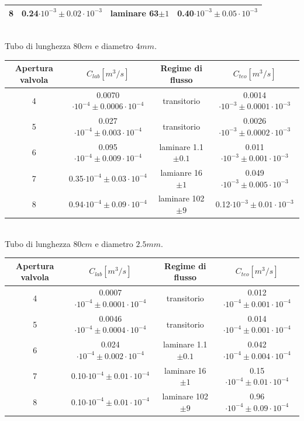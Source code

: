 \documentclass[a4paper,11pt]{article}
\begin{document}
\begin{center}
\begin{tabular}{|c|c|c|c|}
\hline 8 & 0.24$\cdot10^{-3}\pm 0.02\cdot10^{-3}$ & laminare 63$\pm1$ & 0.40$\cdot10^{-3}\pm 0.05\cdot10^{-3}$ \\ 
\hline 
\end{tabular}\\
\vspace{3pt}
Tubo di lunghezza $80cm$ e diametro $4mm$.
\\
\vspace{10pt}
\begin{tabular}{|c|c|c|c|}
\hline Apertura valvola & $C_{lab} [m^3/s]$ & Regime di flusso & $C_{teo} [m^3/s]$ \\ 
\hline 4 & 0.0070$\cdot10^{-4}\pm 0.0006\cdot10^{-4}$ & transitorio & 0.0014$\cdot10^{-3}\pm 0.0001\cdot10^{-3}$ \\ 
\hline 5 & 0.027$\cdot10^{-4}\pm 0.003\cdot10^{-4}$ & transitorio & 0.0026$\cdot10^{-3}\pm 0.0002\cdot10^{-3}$ \\ 
\hline 6 & 0.095$\cdot10^{-4}\pm 0.009\cdot10^{-4}$ & laminare 1.1$\pm0.1$ & 0.011$\cdot10^{-3}\pm 0.001\cdot10^{-3}$\\
\hline 7 & 0.35$\cdot10^{-4}\pm 0.03\cdot10^{-4}$ & lamianre 16$\pm1$ & 0.049$\cdot10^{-3}\pm 0.005\cdot10^{-3}$ \\
\hline 8 & 0.94$\cdot10^{-4}\pm 0.09\cdot10^{-4}$ & laminare 102$\pm9$ & 0.12$\cdot10^{-3}\pm 0.01\cdot10^{-3}$ \\ 
\hline 
\end{tabular}\\
\vspace{3pt}
Tubo di lunghezza $80cm$ e diametro $2.5mm$.
\\
\vspace{10pt}
\begin{tabular}{|c|c|c|c|}
\hline Apertura valvola & $C_{lab} [m^3/s]$ & Regime di flusso & $C_{teo} [m^3/s]$ \\ 
\hline 4 & 0.0007$\cdot10^{-4}\pm 0.0001\cdot10^{-4}$ & transitorio & 0.012$\cdot10^{-4}\pm 0.001\cdot10^{-4}$ \\ 
\hline 5 & 0.0046$\cdot10^{-4}\pm 0.0004\cdot10^{-4}$ & transitorio & 0.014$\cdot10^{-4}\pm 0.001\cdot10^{-4}$ \\ 
\hline 6 & 0.024$\cdot10^{-4}\pm 0.002\cdot10^{-4}$ & laminare 1.1$\pm0.1$ & 0.042$\cdot10^{-4}\pm 0.004\cdot10^{-4}$ \\
\hline 7 & 0.10$\cdot10^{-4}\pm 0.01\cdot10^{-4}$ & laminare 16$\pm1$ & 0.15$\cdot10^{-4}\pm 0.01\cdot10^{-4}$ \\
\hline 8 & 0.10$\cdot10^{-4}\pm 0.01\cdot10^{-4}$ & laminare 102$\pm9$ & 0.96$\cdot10^{-4}\pm 0.09\cdot10^{-4}$ \\ 

\end{tabular}
\end{center}
\end{document}
